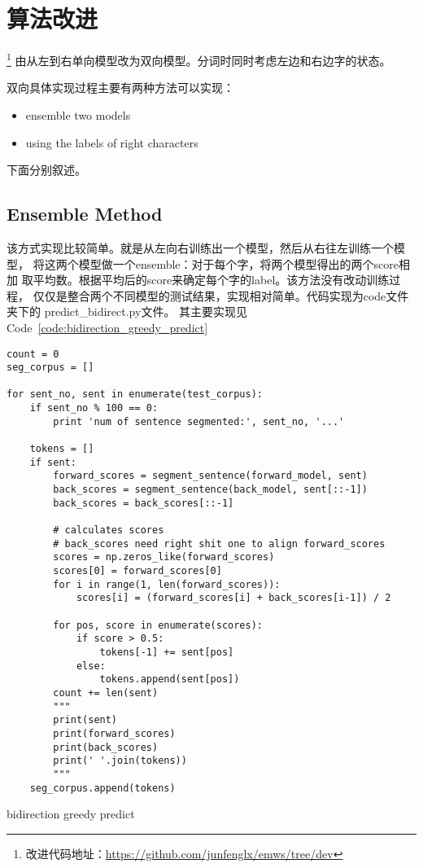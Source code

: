 \documentclass[]{article}
\begin{document}
\section{算法改进}

\footnote{改进代码地址：\url{https://github.com/junfenglx/emws/tree/dev}}
由从左到右单向模型改为双向模型。分词时同时考虑左边和右边字的状态。

双向具体实现过程主要有两种方法可以实现：
\begin{itemize}
\item ensemble two models
\item using the labels of right characters
\end{itemize}

下面分别叙述。

\subsection{Ensemble Method}

该方式实现比较简单。就是从左向右训练出一个模型，然后从右往左训练一个模型，
将这两个模型做一个ensemble：对于每个字，将两个模型得出的两个score相加
取平均数。根据平均后的score来确定每个字的label。该方法没有改动训练过程，
仅仅是整合两个不同模型的测试结果，实现相对简单。代码实现为code文件夹下的
predict\_bidirect.py文件。
其主要实现见Code~\ref{code:bidirection_greedy_predict}

\begin{listing}
\begin{verbatim}
count = 0
seg_corpus = []

for sent_no, sent in enumerate(test_corpus):
    if sent_no % 100 == 0:
        print 'num of sentence segmented:', sent_no, '...'

    tokens = []
    if sent:
        forward_scores = segment_sentence(forward_model, sent)
        back_scores = segment_sentence(back_model, sent[::-1])
        back_scores = back_scores[::-1]

        # calculates scores
        # back_scores need right shit one to align forward_scores
        scores = np.zeros_like(forward_scores)
        scores[0] = forward_scores[0]
        for i in range(1, len(forward_scores)):
            scores[i] = (forward_scores[i] + back_scores[i-1]) / 2

        for pos, score in enumerate(scores):
            if score > 0.5:
                tokens[-1] += sent[pos]
            else:
                tokens.append(sent[pos])
        count += len(sent)
        """
        print(sent)
        print(forward_scores)
        print(back_scores)
        print(' '.join(tokens))
        """
    seg_corpus.append(tokens)
\end{verbatim}
\caption{bidirection greedy predict}
\label{code:bidirection_greedy_predict}
\end{listing}
\end{document}
